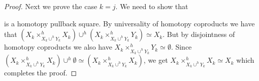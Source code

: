 \begin{corollary}
\begin{proof}
        Next we prove the case $k=j$.
        We need to show that
        \begin{center}
        \end{center}
        is a homotopy pullback square.
        By universality of homotopy coproducts we have that $\left(X_k\times_{X_k\cup^h Y_k}^h X_k\right)\cup^h\left(X_k\times_{X_k\cup^h Y_k}^hY_k\right)\simeq X_k$.
        But by disjointness of homotopy coproducts we also have $X_k\times_{X_k\cup^h Y_k}^hY_k\simeq\emptyset$.
        Since $\left(X_k\times_{X_k\cup^h Y_k}^h X_k\right)\cup^h\emptyset\simeq\left(X_k\times_{X_k\cup^h Y_k}^hX_k\right)$, we get $X_k\times_{X_k\cup^h Y_k}^hX_k\simeq X_k$ which completes the proof.
    \end{proof}
\end{corollary}
